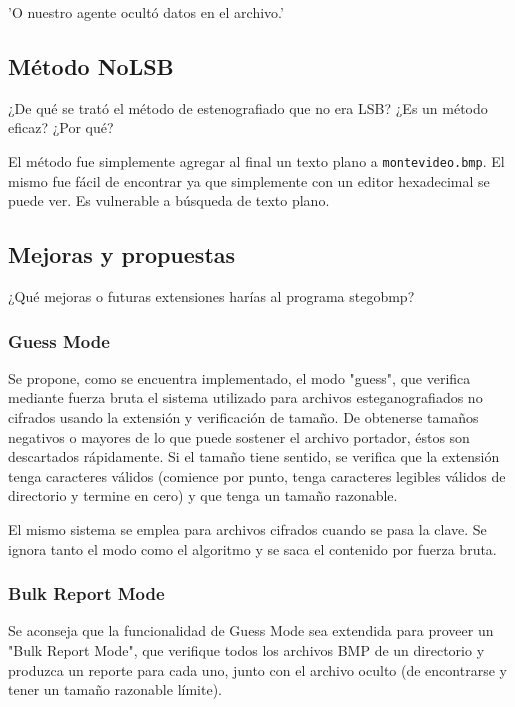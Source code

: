 'O nuestro agente ocult\'o datos en el archivo.'


\subsection{Método NoLSB}
\begin{displayquote}
¿De qué se trató el método de estenografiado que no era LSB? ¿Es un método eficaz? ¿Por qué?
\end{displayquote}

El método fue simplemente agregar al final un texto plano a \texttt{montevideo.bmp}. El mismo fue fácil de encontrar ya que simplemente con un editor hexadecimal se puede ver. Es vulnerable a búsqueda de texto plano.

\subsection{Mejoras y propuestas}

\begin{displayquote}
¿Qué mejoras o futuras extensiones harías al programa stegobmp? 
\end{displayquote}

\subsubsection{Guess Mode}

Se propone, como se encuentra implementado, el modo "guess", que verifica mediante fuerza bruta el sistema utilizado para archivos esteganografiados no cifrados usando la extensión y verificación de tamaño. De obtenerse tamaños negativos o mayores de lo que puede sostener el archivo portador, éstos son descartados rápidamente. Si el tamaño tiene sentido, se verifica que la extensión tenga caracteres válidos (comience por punto, tenga caracteres legibles válidos de directorio y termine en cero) y que tenga un tamaño razonable.

El mismo sistema se emplea para archivos cifrados cuando se pasa la clave. Se ignora tanto el modo como el algoritmo y se saca el contenido por fuerza bruta.

\subsubsection{Bulk Report Mode}

Se aconseja que la funcionalidad de Guess Mode sea extendida para proveer un "Bulk Report Mode", que verifique todos los archivos BMP de un directorio y produzca un reporte para cada uno, junto con el archivo oculto (de encontrarse y tener un tamaño razonable límite).


